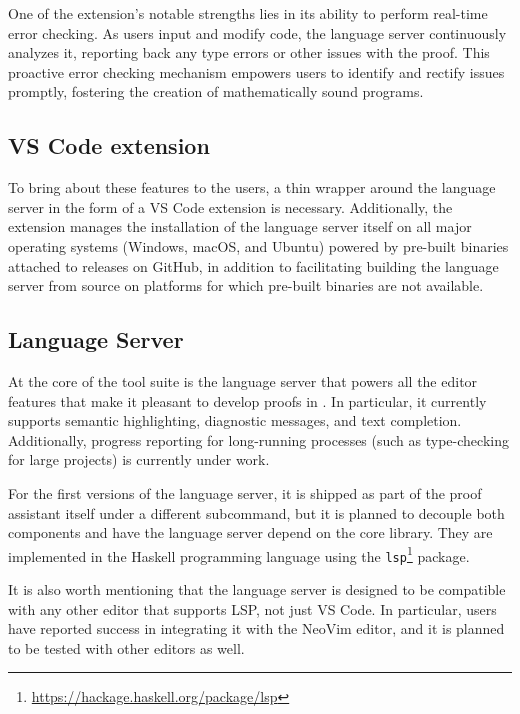 One of the extension's notable strengths lies in its ability to perform real-time error checking.
As users input and modify code, the language server continuously analyzes it,
reporting back any type errors or other issues with the proof.
This proactive error checking mechanism empowers users to identify and rectify issues promptly,
fostering the creation of mathematically sound programs.

\subsection{VS Code extension}

To bring about these features to the users, a thin wrapper around the language server in the form of a VS Code extension is necessary.
Additionally, the extension manages the installation of the language server itself on all major operating systems (Windows, macOS, and Ubuntu)
powered by pre-built binaries attached to releases on GitHub,
in addition to facilitating building the language server from source on platforms
for which pre-built binaries are not available.

\subsection{\Rzk{} Language Server}

At the core of the \Rzk{} tool suite is the language server that powers all the editor features that make it pleasant to develop proofs in \Rzk{}. In particular, it currently supports semantic highlighting, diagnostic messages, and text completion. Additionally, progress reporting for long-running processes (such as type-checking for large projects) is currently under work.

For the first versions of the language server, it is shipped as part of the \Rzk{} proof assistant itself under a different subcommand, but it is planned to decouple both components and have the language server depend on the core library. They are implemented in the Haskell programming language using the \texttt{lsp}\footnote{\url{https://hackage.haskell.org/package/lsp}} package.

It is also worth mentioning that the language server is designed to be compatible
with any other editor that supports LSP, not just VS Code.
In particular, users have reported success in integrating it with the NeoVim editor,
and it is planned to be tested with other editors as well.

